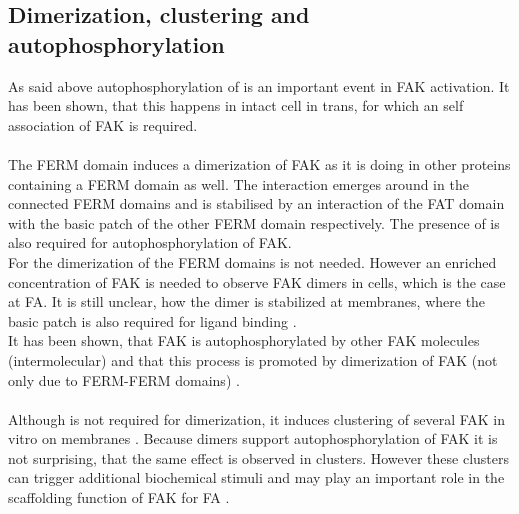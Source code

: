 \subsection{Dimerization, clustering and autophosphorylation}
As said above autophosphorylation of  is an important event in FAK activation. It has been shown, that this happens in intact cell in trans, for which an self association of FAK is required.\\
\\
The FERM domain induces a dimerization of FAK as it is doing in other proteins containing a FERM domain as well. The interaction emerges around  in the connected FERM domains and is stabilised by an interaction of the FAT domain with the basic patch of the other FERM domain respectively. The presence of  is also required for autophosphorylation of FAK.\\ For the dimerization of the FERM domains \pip{} is not needed. However an enriched concentration of FAK is needed to observe FAK dimers in cells, which is the case at FA. It is still unclear, how the dimer is stabilized at membranes, where the basic patch is also required for ligand binding \autocite{fakdimers}.\\
It has been shown, that FAK is autophosphorylated by other FAK molecules (intermolecular) and that this process is promoted by dimerization of FAK (not only due to FERM-FERM domains) \autocite{dimersVsClusters}.\\
\\
Although \pip{} is not required for dimerization, it induces clustering of several FAK in vitro on membranes \autocite{pap001}. Because dimers support autophosphorylation of FAK it is not surprising, that the same effect is observed in clusters. However these clusters can trigger additional biochemical stimuli \autocite{dimersVsClusters} and may play an important role in the scaffolding function of FAK for FA \autocite{pap001}.
